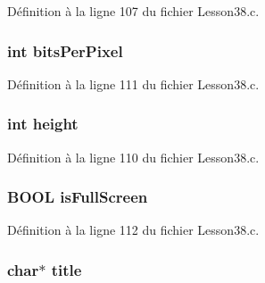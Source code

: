 Définition à la ligne 107 du fichier Lesson38.\+c.

\subsubsection[{\texorpdfstring{bits\+Per\+Pixel}{bitsPerPixel}}]{\setlength{\rightskip}{0pt plus 5cm}int bits\+Per\+Pixel}\hypertarget{struct_g_l___window_init_afd58fbbba1e33d7cf243b2ee855ed628}{}\label{struct_g_l___window_init_afd58fbbba1e33d7cf243b2ee855ed628}


Définition à la ligne 111 du fichier Lesson38.\+c.

\subsubsection[{\texorpdfstring{height}{height}}]{\setlength{\rightskip}{0pt plus 5cm}int height}\hypertarget{struct_g_l___window_init_ad12fc34ce789bce6c8a05d8a17138534}{}\label{struct_g_l___window_init_ad12fc34ce789bce6c8a05d8a17138534}


Définition à la ligne 110 du fichier Lesson38.\+c.

\subsubsection[{\texorpdfstring{is\+Full\+Screen}{isFullScreen}}]{\setlength{\rightskip}{0pt plus 5cm}B\+O\+OL is\+Full\+Screen}\hypertarget{struct_g_l___window_init_ac439e465e74e3c5ebfa70c647a78aded}{}\label{struct_g_l___window_init_ac439e465e74e3c5ebfa70c647a78aded}


Définition à la ligne 112 du fichier Lesson38.\+c.

\subsubsection[{\texorpdfstring{title}{title}}]{\setlength{\rightskip}{0pt plus 5cm}char$\ast$ title}\hypertarget{struct_g_l___window_init_af06d911bb9e05f491ef3da520d03796c}{}\label{struct_g_l___window_init_af06d911bb9e05f491ef3da520d03796c}


